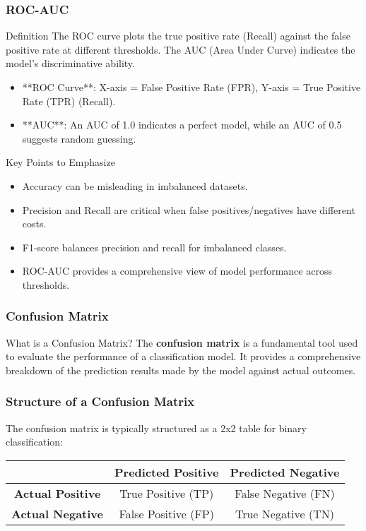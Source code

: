 \documentclass{beamer}
\begin{document}
\begin{frame}[fragile]
    \frametitle{ROC-AUC}
    \begin{block}{Definition}
        The ROC curve plots the true positive rate (Recall) against the false positive rate at different thresholds. The AUC (Area Under Curve) indicates the model's discriminative ability.
    \end{block}

    \begin{itemize}
        \item **ROC Curve**: X-axis = False Positive Rate (FPR), Y-axis = True Positive Rate (TPR) (Recall).
        \item **AUC**: An AUC of 1.0 indicates a perfect model, while an AUC of 0.5 suggests random guessing.
    \end{itemize}
    
    \begin{block}{Key Points to Emphasize}
        \begin{itemize}
            \item Accuracy can be misleading in imbalanced datasets.
            \item Precision and Recall are critical when false positives/negatives have different costs.
            \item F1-score balances precision and recall for imbalanced classes.
            \item ROC-AUC provides a comprehensive view of model performance across thresholds.
        \end{itemize}
    \end{block}
\end{frame}

\begin{frame}[fragile]
    \frametitle{Confusion Matrix}
    \begin{block}{What is a Confusion Matrix?}
        The \textbf{confusion matrix} is a fundamental tool used to evaluate the performance of a classification model. 
        It provides a comprehensive breakdown of the prediction results made by the model against actual outcomes.
    \end{block}
\end{frame}

\begin{frame}[fragile]
    \frametitle{Structure of a Confusion Matrix}
    The confusion matrix is typically structured as a 2x2 table for binary classification:

    \begin{center}
    \begin{tabular}{|c|c|c|}
        \hline
        & \textbf{Predicted Positive} & \textbf{Predicted Negative} \\
        \hline
        \textbf{Actual Positive} & True Positive (TP) & False Negative (FN) \\
        \hline
        \textbf{Actual Negative} & False Positive (FP) & True Negative (TN) \\
        \hline
    \end{tabular}
    \end{center}
\end{frame}
\end{document}

